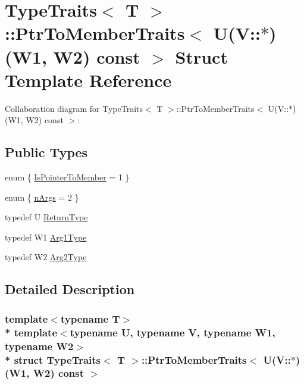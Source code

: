 \hypertarget{structTypeTraits_1_1PtrToMemberTraits_3_01U_07V_1_1_5_08_07W1_00_01W2_08_01const_01_01_4}{}\section{Type\+Traits$<$ T $>$\+:\+:Ptr\+To\+Member\+Traits$<$ U(V\+:\+:$\ast$)(W1, W2) const $>$ Struct Template Reference}
\label{structTypeTraits_1_1PtrToMemberTraits_3_01U_07V_1_1_5_08_07W1_00_01W2_08_01const_01_01_4}


Collaboration diagram for Type\+Traits$<$ T $>$\+:\+:Ptr\+To\+Member\+Traits$<$ U(V\+:\+:$\ast$)(W1, W2) const $>$\+:
\subsection*{Public Types}
\begin{DoxyCompactItemize}
\item 
enum \{ \hyperlink{structTypeTraits_1_1PtrToMemberTraits_3_01U_07V_1_1_5_08_07W1_00_01W2_08_01const_01_01_4_aa144a385d3341d4473a316d4881e604ea95af5c496d61cc3101437d6ab0c620ef}{Is\+Pointer\+To\+Member} = 1
 \}
\item 
enum \{ \hyperlink{structTypeTraits_1_1PtrToMemberTraits_3_01U_07V_1_1_5_08_07W1_00_01W2_08_01const_01_01_4_a3f0c4eeb82e815513256955f2068e041a5561fb5dad735ae60b4d21a94e3c22be}{n\+Args} = 2
 \}
\item 
typedef U \hyperlink{structTypeTraits_1_1PtrToMemberTraits_3_01U_07V_1_1_5_08_07W1_00_01W2_08_01const_01_01_4_a5ad1c5f1ba1aede7b1234b6b0bc902af}{Return\+Type}
\item 
typedef W1 \hyperlink{structTypeTraits_1_1PtrToMemberTraits_3_01U_07V_1_1_5_08_07W1_00_01W2_08_01const_01_01_4_ad797cd1fdf8b1af3b7a829d45014cafa}{Arg1\+Type}
\item 
typedef W2 \hyperlink{structTypeTraits_1_1PtrToMemberTraits_3_01U_07V_1_1_5_08_07W1_00_01W2_08_01const_01_01_4_aaa85a115596e04ee27fdd88db17724a2}{Arg2\+Type}
\end{DoxyCompactItemize}


\subsection{Detailed Description}
\subsubsection*{template$<$typename T$>$\\*
template$<$typename U, typename V, typename W1, typename W2$>$\\*
struct Type\+Traits$<$ T $>$\+::\+Ptr\+To\+Member\+Traits$<$ U(\+V\+::$\ast$)(\+W1, W2) const  $>$}

